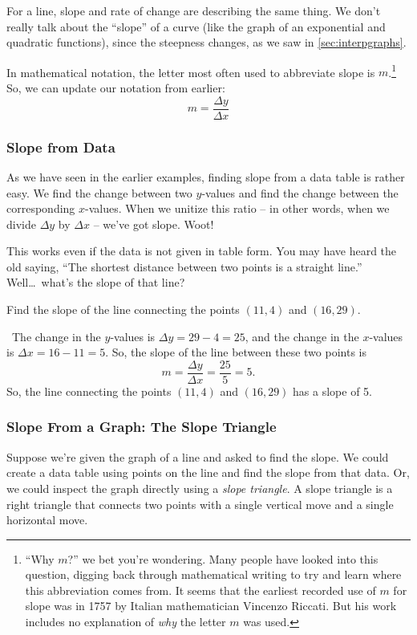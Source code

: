 For a line, slope and rate of change are describing the same thing. We don't really talk about the ``slope'' of a curve (like the graph of an exponential and quadratic functions), since the steepness changes, as we saw in \cref{sec:interpgraphs}.

In mathematical notation, the letter most often used to abbreviate slope is $m$.\footnote{``Why $m$?'' we bet you're wondering. Many people have looked into this question, digging back through mathematical writing to try and learn where this abbreviation comes from. It seems that the earliest recorded use of $m$ for slope was in 1757 by Italian mathematician Vincenzo Riccati. But his work includes no explanation of \textit{why} the letter $m$ was used.} So, we can update our notation from earlier:
\[m = \frac{\Delta y}{\Delta x}\]

\subsubsection{Slope from Data}

As we have seen in the earlier examples, finding slope from a data table is rather easy. We find the change between two $y$-values and find the change between the corresponding $x$-values. When we unitize this ratio -- in other words, when we divide $\Delta y$ by $\Delta x$ -- we've got slope. Woot!

This works even if the data is not given in table form. You may have heard the old saying, ``The shortest distance between two points is a straight line.'' Well\ldots\ what's the slope of that line?

\begin{boxedex}
Find the slope of the line connecting the points $(11, 4)$ and $(16, 29)$.

\exsoln\ The change in the $y$-values is $\Delta y = 29-4 = 25$, and the change in the $x$-values is $\Delta x = 16-11=5$. So, the slope of the line between these two points is \[m = \frac{\Delta y}{\Delta x} = \frac{25}{5} = 5.\]
So, the line connecting the points $(11, 4)$ and $(16, 29)$ has a slope of 5.
\end{boxedex}

\subsubsection{Slope From a Graph: The Slope Triangle}

Suppose we're given the graph of a line and asked to find the slope. We could create a data table using points on the line and find the slope from that data. Or, we could inspect the graph directly using a \textit{slope triangle}. A slope triangle is a right triangle that connects two points with a single vertical move and a single horizontal move.

